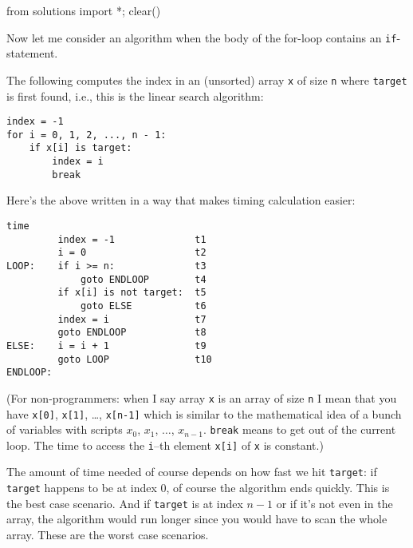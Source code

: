 \begin{python0}
from solutions import *; clear()
\end{python0}

Now let me consider an algorithm 
when the body of the for-loop 
contains an \verb!if!-statement.

The following computes the index in an (unsorted) 
array \verb!x! of size \verb!n!
where \verb!target! is 
first found, i.e., this is the linear search algorithm:

\begin{Verbatim}[frame=single, fontsize=\footnotesize]
index = -1
for i = 0, 1, 2, ..., n - 1:
    if x[i] is target:
        index = i
        break
\end{Verbatim}
Here's the above written in a way that makes timing calculation easier:
\begin{Verbatim}[frame=single, fontsize=\footnotesize]
                                 time   
         index = -1              t1 
         i = 0                   t2 
LOOP:    if i >= n:              t3  
             goto ENDLOOP        t4 
         if x[i] is not target:  t5
             goto ELSE           t6
         index = i               t7 
         goto ENDLOOP            t8
ELSE:    i = i + 1               t9 
         goto LOOP               t10 
ENDLOOP:
\end{Verbatim}

(For non-programmers:
when I say array \verb!x! is an array of size \verb!n! I mean that
you have \verb!x[0]!, \verb!x[1]!, \ldots, \verb!x[n-1]!
which is similar to the mathematical idea of 
a bunch of variables with scripts $x_0$, $x_1$, $\ldots$, $x_{n-1}$.
\verb!break! means to get out of the current loop.
The time to access the \verb!i!--th element \verb!x[i]! of \verb!x! is
constant.)

The amount of time needed of course depends on how fast we hit \verb!target!:
if \verb!target! happens to be at index 0, of course the algorithm ends
quickly. 
This is the best case scenario.
And if \verb!target! is at index $n-1$ or if it's not even in the array,
the algorithm would run longer since you would have to scan the whole array.
These are the worst case scenarios.

